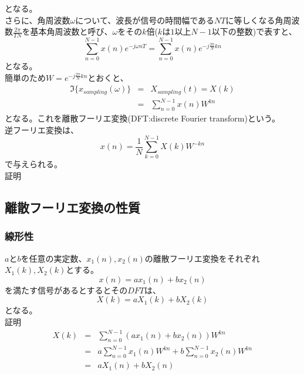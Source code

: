 \documentclass[a4paper]{jsarticle}
\begin{document}
となる。\\
さらに、角周波数$\omega$について、波長が信号の時間幅である$NT$に等しくなる角周波数$\frac { 2 \pi } { TN }$を基本角周波数と呼び、$\omega$をその$k$倍($k$は$1$以上$N-1$以下の整数)で表すと、
\begin{equation}
\sum _{ n = 0 } ^{ N - 1 } x \left( n \right) e ^ { -j \omega nT } = \sum _{ n = 0 } ^{ N - 1 } x \left( n \right) e ^ { -j \frac { 2 \pi } { N } kn }
\end{equation}
となる。\\
簡単のため$W = e ^{ -j \frac { 2 \pi } { N } kn}$とおくと、
\begin{eqnarray}
	\mathfrak{I} \bigl\{ x_{sampling} \left( \omega \right) \bigr\} &=& X_{sampling} \left( t \right) \nonumber = X \left( k \right) \\
	&=& \sum _{ n = 0 } ^{ N - 1 } x \left( n \right) W ^{ kn }
\end{eqnarray}
となる。これを離散フーリエ変換(DFT:discrete Fourier transform)という。\\
逆フーリエ変換は、
\begin{equation}
	x \left( n \right) = \frac { 1 } { N } \sum _{ k = 0 } ^{ N - 1 } X \left( k \right) W ^ { -kn }
\end{equation}
で与えられる。\\
証明
\subsection{離散フーリエ変換の性質}
\subsubsection{線形性}
$a$と$b$を任意の実定数、$x_1 \left( n \right), x_2 \left( n \right)$の離散フーリエ変換をそれぞれ$X_1 \left( k \right), X_2 \left( k \right)$とする。
\begin{equation}
x \left( n \right) = ax_1 \left( n \right) + bx_2 \left( n \right)
\end{equation}
を満たす信号があるとするとその$DFT$は、
\begin{equation}
X \left( k \right) = aX_1 \left( k \right) + bX_2 \left( k \right)
\end{equation}
となる。\\
証明
\begin{eqnarray}
	X \left( k \right) &=& \sum _{n = 0} ^{N - 1} \left( ax_1 \left( n \right) + bx_2 \left( n \right) \right) W ^{kn} \nonumber \\
	&=& a \sum _{n = 0} ^{N -1} x_1 \left( n \right) W ^{kn} + b \sum _{n = 0} ^{N - 1} x_2 \left( n \right) W ^{kn} \nonumber \\
	&=& aX_1 \left( n \right) + bX_2 \left( n \right)
\end{eqnarray}
\end{document}
